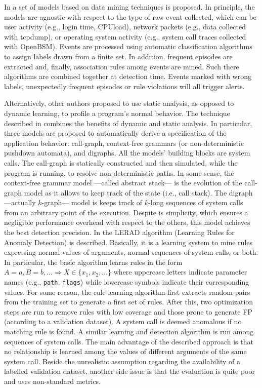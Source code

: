 \documentclass[12pt]{article}
\theoremstyle{definition}
\begin{document}
			
			In a set of models based on data mining
			techniques is proposed. In principle, the models are agnostic with
			respect to the type of raw event collected, which can be user activity
			(e.g., login time, CPUload), network packets (e.g.,
			data collected with tcpdump), or operating
			system activity (e.g., system call traces collected with OpenBSM). Events are processed using automatic classification
			algorithms to assign labels drawn from a finite set. In addition,
			frequent episodes are extracted and, finally, association rules among
			events are mined. Such there algorithms are combined together at
			detection time. Events marked with wrong labels, unexpectedly frequent
			episodes or rule violations will all trigger alerts.
			
			
			Alternatively, other authors proposed to use static analysis, as
			opposed to dynamic learning, to profile a program's normal
			behavior. The technique described in combines the benefits of dynamic
			and static analysis. In particular, three models are proposed to
			automatically derive a specification of the application behavior:
			call-graph, context-free grammars (or non-deterministic pushdown
			automata), and digraphs. All the models' building blocks are system
			calls. The call-graph is statically constructed and then simulated,
			while the program is running, to resolve non-deterministic paths. In
			some sense, the context-free grammar model ---called abstract stack---
			is the evolution of the call-graph model as it allows to keep track of
			the state (i.e., call stack). The digraph ---actually $k$-graph---
			model is keeps track of $k$-long sequences of system calls from an
			arbitrary point of the execution. Despite is simplicity, which ensures
			a negligible performance overhead with respect to the others, this
			model achieves the best detection precision.
			In \cite{Mahapatra2016} the LERAD
			algorithm (Learning Rules for Anomaly Detection) is
			described. Basically, it is a learning system to mine rules expressing
			normal values of arguments, normal sequences of system calls, or
			both. In particular, the basic algorithm learns rules in the form $A =
			a, B = b, \dots \Rightarrow X \in \{x_{1}, x_{2}, \dots\}$ where
			uppercase letters indicate parameter names (e.g., \texttt{path},
			\texttt{flags}) while lowercase symbols indicate their corresponding
			values. For some reason, the rule-learning algorithm first extracts
			random pairs from the training set to generate a first set of
			rules. After this, two optimization steps are run to remove rules with
			low coverage and those prone to generate FP (according
			to a validation dataset). A system call is deemed anomalous if no
			matching rule is found. A similar learning and detection algorithm is
			run among sequences of system calls. The main advantage of the
			described approach is that no relationship is learned among the values
			of different arguments of the same system call. Beside the unrealistic
			assumption regarding the availability of a labelled validation dataset,
			another side issue is that the evaluation is quite poor and uses
			non-standard metrics.
			
\end{document}
